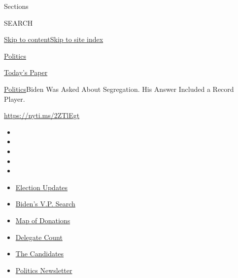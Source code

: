 Sections

SEARCH

\protect\hyperlink{site-content}{Skip to
content}\protect\hyperlink{site-index}{Skip to site index}

\href{https://www.nytimes.com/section/politics}{Politics}

\href{https://myaccount.nytimes.com/auth/login?response_type=cookie\&client_id=vi}{}

\href{https://www.nytimes.com/section/todayspaper}{Today's Paper}

\href{/section/politics}{Politics}\textbar{}Biden Was Asked About
Segregation. His Answer Included a Record Player.

\url{https://nyti.ms/2ZTlEgt}

\begin{itemize}
\item
\item
\item
\item
\item
\end{itemize}

\begin{itemize}
\item
  \href{https://www.nytimes.com/2020/07/31/us/elections/biden-vs-trump.html?action=click\&pgtype=Article\&state=default\&region=TOP_BANNER\&context=storylines_menu}{Election
  Updates}
\item
  \href{https://www.nytimes.com/article/biden-vice-president-2020.html?action=click\&pgtype=Article\&state=default\&region=TOP_BANNER\&context=storylines_menu}{Biden's
  V.P. Search}
\item
  \href{https://www.nytimes.com/interactive/2020/07/24/us/politics/trump-biden-campaign-donors.html?action=click\&pgtype=Article\&state=default\&region=TOP_BANNER\&context=storylines_menu}{Map
  of Donations}
\item
  \href{https://www.nytimes.com/interactive/2020/us/elections/delegate-count-primary-results.html?action=click\&pgtype=Article\&state=default\&region=TOP_BANNER\&context=storylines_menu}{Delegate
  Count}
\item
  \href{https://www.nytimes.com/interactive/2019/us/politics/2020-presidential-candidates.html?action=click\&pgtype=Article\&state=default\&region=TOP_BANNER\&context=storylines_menu}{The
  Candidates}
\item
  \href{https://www.nytimes.com/newsletters/politics?action=click\&pgtype=Article\&state=default\&region=TOP_BANNER\&context=storylines_menu}{Politics
  Newsletter}
\end{itemize}

